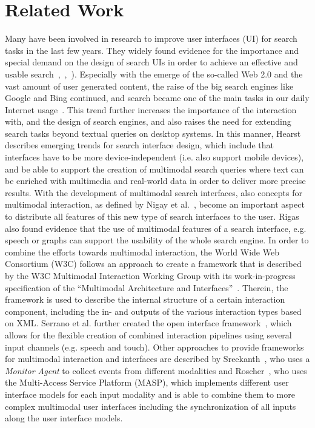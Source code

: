 \documentclass[runningheads,a4paper]{llncs} \usepackage[utf8]{inputenc}
\begin{document}
\section{Related Work} \label{sec:related}
Many have been involved in research to improve user interfaces (UI) for search tasks in the last few years. They widely found evidence for the importance and special demand on the design of search UIs in order to achieve an effective and usable search~\cite{hearst2009},~\cite{quesenbery2008},~\cite{huangTsaiChang2009}). Especially with the emerge of the so-called Web 2.0 and the vast amount of user generated content, the raise of the big search engines like Google and Bing continued, and search became one of the main tasks in our daily Internet usage~\cite{quesenbergWeb2008}. This trend further increases the importance of the interaction with, and the design of search engines, and also raises the need for extending search tasks beyond textual queries on desktop systems. In this manner, Hearst~\cite{hearst2011} describes emerging trends for search interface design, which include that interfaces have to be more device-independent (i.e. also support mobile devices), and be able to support the creation of multimodal search queries where text can be enriched with multimedia and real-world data in order to deliver more precise results. With the development of multimodal search interfaces, also concepts for multimodal interaction, as defined by Nigay et al.~\cite{nigay}, become an important aspect to distribute all features of this new type of search interfaces to the user. Rigas~\cite{rigas2007} also found evidence that the use of multimodal features of a search interface, e.g. speech or graphs can support the usability of the whole search engine. In order to combine the efforts towards multimodal interaction, the World Wide Web Consortium (W3C) follows an approach to create a framework that is described by the W3C Multimodal Interaction Working Group with its work-in-progress specification of the ``Multimodal Architecture and Interfaces''~\cite{w3cMMI}. Therein, the framework is used to describe the internal structure of a certain interaction component, including the in- and outputs of the various interaction types based on XML. Serrano et al. further created the open interface framework~\cite{openinterface}, which allows for the flexible creation of combined interaction pipelines using several input channels (e.g. speech and touch). Other approaches to provide frameworks for multimodal interaction and interfaces are described by Sreekanth~\cite{sreekanth}, who uses a \textit{Monitor Agent} to collect events from different modalities and Roscher~\cite{roscher}, who uses the Multi-Access Service Platform (MASP), which implements different user interface models for each input modality and is able to combine them to more complex multimodal user interfaces including the synchronization of all inputs along the user interface models.
\end{document}
